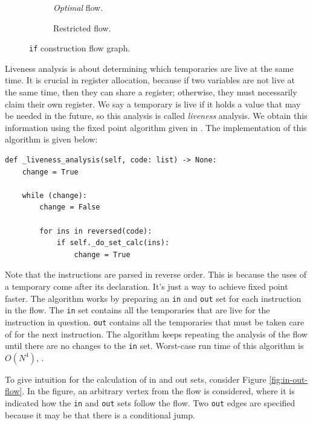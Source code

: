\begin{figure}[H]
    \centering
    \begin{subfigure}{0.49\textwidth}
        \centering
        
        \caption{\textit{Optimal} flow.}
        \label{fig:if}
    \end{subfigure}
    \begin{subfigure}{0.49\textwidth}
        \centering
        
        \caption{Restricted flow.}
        \label{fig:restriected}
    \end{subfigure}
    \caption{\texttt{if} construction flow graph.}
\end{figure}

Liveness analysis is about determining which temporaries are live at the same time. It is crucial in register allocation, because if two variables are not live at the same time, then they can share a register; otherwise, they must necessarily claim their own register. We say a temporary is live if it holds a value that may be needed in the future, so this analysis is called \textit{liveness} analysis. We obtain this information using the fixed point algorithm given in \cite[221]{ModernCompilerImplementation}. The implementation of this algorithm is given below:

\begin{verbatim}
def _liveness_analysis(self, code: list) -> None:
    change = True

    while (change):
        change = False

        for ins in reversed(code):
            if self._do_set_calc(ins):
                change = True
\end{verbatim}

Note that the instructions are parsed in reverse order. This is because the uses of a temporary come after its declaration. It's just a way to achieve fixed point faster. The algorithm works by preparing an \texttt{in} and \texttt{out} set for each instruction in the flow. The \texttt{in} set contains all the temporaries that are live for the instruction in question. \texttt{out} contains all the temporaries that must be taken care of for the next instruction. The algorithm keeps repeating the analysis of the flow until there are no changes to the \texttt{in} set. Worst-case run time of this algorithm is $O(N^4)$, \cite[224]{ModernCompilerImplementation}. 

To give intuition for the calculation of in and out sets, consider Figure \ref{fig:in-out-flow}. In the figure, an arbitrary vertex from the flow is considered, where it is indicated how the \texttt{in} and \texttt{out} sets follow the flow. Two \texttt{out} edges are specified because it may be that there is a conditional jump.

